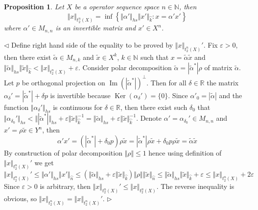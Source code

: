\documentclass[12pt]{article}
\newtheorem{proposition}[theorem]{Proposition}
\newenvironment{proof}{\par $\triangleleft$}{$\triangleright$}
\begin{document}
\begin{proposition}\label{PrT2nNormProperty}
Let $X$ be a operator sequence space $n\in\mathbb{N}$, then
$$
\Vert x\Vert_{t_2^n(X)}=\inf\left\{\Vert\alpha'\Vert_{hs}\Vert x'\Vert_{\wideparen{k}}:x=\alpha'x'\right\}
$$
where $\alpha'\in M_{n,n}$ is an invertible matrix and $x'\in X^{n}$.
\end{proposition}
\begin{proof}
Define right hand side of the equality to be proved by $\Vert x\Vert_{t_2^n(X)}'$. Fix $\varepsilon>0$, then there exist $\tilde{\alpha}\in M_{n,k}$ and $\tilde{x}\in X^{k}$, $k\in\mathbb{N}$ such that 
$x=\tilde{\alpha}\tilde{x}$ and $\Vert\tilde{\alpha}\Vert_{hs}\Vert\tilde{x}\Vert_{\wideparen{k}}<\Vert x\Vert_{t_2^n(X)}+\varepsilon$. Consider polar decomposition 
$\tilde{\alpha}=|\tilde{\alpha}^*| \rho$ of matrix $\tilde{\alpha}$. Let $p$ be orthogonal projection on $\operatorname{Im}(|\tilde{\alpha}^*|)^\perp$. Then for all $\delta\in\mathbb{R}$ the matrix 
$\alpha_\delta'=|\tilde{\alpha}^*|+\delta p$ is invertible because $\operatorname{Ker}(\alpha_\delta')=\{0\}$. Since $\alpha'_0=|\tilde{\alpha}|$ and the function $\Vert\alpha_\delta'\Vert_{hs}$ is continuous for $\delta\in\mathbb{R}$, then there exist such $\delta_0$ that 
$\Vert\alpha_{\delta_0}'\Vert_{hs}<\Vert|\tilde{\alpha}^*|\Vert_{hs}+\varepsilon\Vert \tilde{x}\Vert_{\wideparen{k}}^{-1}=\Vert\tilde{\alpha}\Vert_{hs}+\varepsilon\Vert \tilde{x}\Vert_{\wideparen{k}}^{-1}$. 
Denote $\alpha'=\alpha_{\delta_0}'\in M_{n,n}$ and $x'=\rho\tilde{x}\in Y^n$, then 
$$
\alpha'x'
=(|\tilde{\alpha}^*|+\delta_0 p)\rho \tilde{x}
=|\tilde{\alpha}^*|\rho \tilde{x}+\delta_0 p\rho \tilde{x}
=\tilde{\alpha}\tilde{x}
$$
By construction of polar decomposition $\Vert \rho\Vert\leq 1$ hence using definition of $\Vert x\Vert_{t_2^n(X)}'$ we get
$$
\Vert x\Vert_{t_2^n(X)}'\leq
\Vert\alpha'\Vert_{hs}\Vert x'\Vert_{\wideparen{n}}
\leq (\Vert\tilde{\alpha}\Vert_{hs}+\varepsilon\Vert \tilde{x}\Vert_{\wideparen{k}})\Vert \rho\Vert\Vert\tilde{x}\Vert_{\wideparen{n}}
\leq\Vert\tilde{\alpha}\Vert_{hs}\Vert\tilde{x}\Vert_{\wideparen{k}}+\varepsilon
\leq \Vert x\Vert_{t_2^n(X)}+2\varepsilon
$$
Since $\varepsilon>0$ is arbitrary, then $\Vert x\Vert_{t_2^n(X)}'\leq\Vert x\Vert_{t_2^n(X)}$. The reverse inequality is obvious, so $\Vert x\Vert_{t_2^n(X)}=\Vert x\Vert_{t_2^n(X)}'$.
\end{proof}
\end{document}
